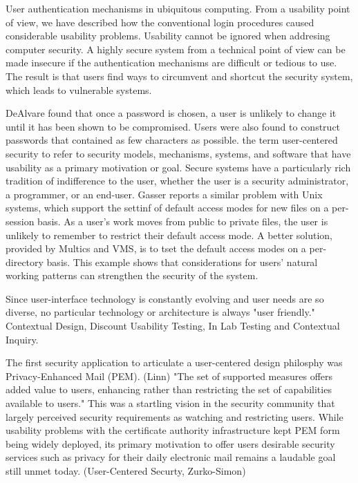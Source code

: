 \documentclass{article}
\begin{document}
User authentication mechanisms in ubiquitous computing. 
From a usability point of view, we have described how the conventional login procedures caused considerable usability problems. 
Usability cannot be ignored when addresing computer security. 
A highly secure system from a technical point of view can be made insecure if the authentication mechanisms are difficult or tedious to use. The result is that users find ways to circumvent and shortcut the security system, which leads to vulnerable systems. 

DeAlvare found that once a password is chosen, a user is unlikely to change it until it has been shown to be compromised. Users were also found to construct passwords that contained as few characters as possible.
the term user-centered security to refer to security models, mechanisms, systems, and software that have usability as a primary motivation or goal. 
Secure systems have a particularly rich tradition of indifference to the user, whether the user is a security administrator, a programmer, or an end-user. 
Gasser reports a similar problem with Unix systems, which support the settinf of default access modes for new files on a per-session basis. As a user's work moves from public to private files, the user is unlikely to remember to restrict their default access mode. A better solution, provided by Multics and VMS, is to tset the default access modes on a per-directory basis. This example shows that considerations for users' natural working patterns can strengthen the security of the system. 

Since user-interface technology is constantly evolving and user needs are so diverse, no particular technology or architecture is always "user friendly."  
Contextual Design, Discount Usability Testing, In Lab Testing and Contextual Inquiry. 

The first security application to articulate a user-centered design philosphy was Privacy-Enhanced Mail (PEM). (Linn) "The set of supported measures offers added value to users, enhancing rather than restricting the set of capabilities available to users." This was a startling vision in the security community that largely perceived security requirements as watching and restricting users. While usability problems with the certificate authority infrastructure kept PEM form being widely deployed, its primary motivation to offer users desirable security services such as privacy for their daily electronic mail remains a laudable goal still  unmet today.  (User-Centered Securty, Zurko-Simon)
\end{document}
